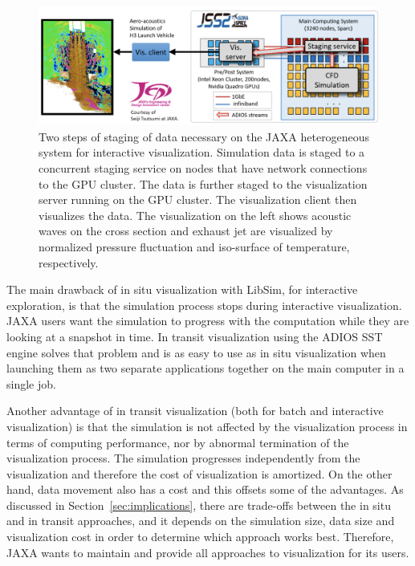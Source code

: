 \documentclass[x11names,table,xcdraw,graybox]{svmult}
\begin{document}
\begin{figure}[b]
\includegraphics[width=1\linewidth]{figures/JAXA.png}
\caption{Two steps of staging of data necessary on the JAXA heterogeneous system for interactive visualization. Simulation data is staged to a concurrent staging service on nodes that have network connections to the GPU cluster. The data is further staged to the visualization server running on the GPU cluster. The visualization client then visualizes the data. The visualization on the left shows acoustic waves on the cross section and exhaust jet are visualized by normalized pressure fluctuation and iso-surface of temperature, respectively.}
\label{ch10:fig:insituJAXA_arch}
\end{figure}

The main drawback of in situ visualization with LibSim, for interactive exploration, is that the simulation process stops during interactive visualization. JAXA users want the simulation to progress with the computation while they are looking at a snapshot in time. In transit visualization using the ADIOS SST engine solves that problem and is as easy to use as in situ visualization when launching them as two separate applications together on the main computer in a single job.

Another advantage of in transit visualization (both for batch and interactive visualization) is that the simulation is not affected by the visualization process in terms of computing performance, nor by abnormal termination of the visualization process. The simulation progresses independently from the visualization and therefore the cost of visualization is amortized. On the other hand, data movement also has a cost and this offsets some of the advantages.
As discussed in Section~\ref{sec:implications}, there are trade-offs between the in situ and in transit approaches, and it depends on the simulation size, data size and visualization cost in order to determine which approach works best. Therefore, JAXA wants to maintain and provide all approaches to visualization for its users.
\end{document}
